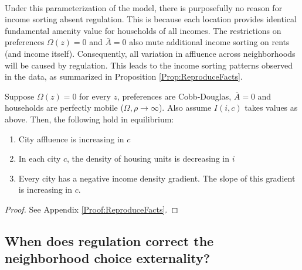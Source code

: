 \documentclass[12pt]{article}
\begin{document}
	\paragraph*{}
	Under this parameterization of the model, there is purposefully no reason for income sorting absent regulation. This is because each location provides identical fundamental amenity value for households of all incomes. The restrictions on preferences $\Omega(z) = 0$ and $\bar{A} = 0$ also mute additional income sorting on rents (and income itself).  Consequently, all variation in affluence across neighborhoods will be caused by regulation. This leads to the income sorting patterns observed in the data, as summarized in Proposition \ref{Prop:ReproduceFacts}.
	\begin{Proposition}\label{Prop:ReproduceFacts}
	Suppose $\Omega(z) = 0$ for every $z$, preferences are Cobb-Douglas, $\bar{A} = 0$ and households are perfectly mobile ($\Omega, \rho \to \infty$). Also assume $I(i, c)$ takes values as above. Then, the following hold in equilibrium:
	
		\begin{enumerate}
			\item City affluence is increasing in $c$
		
			\item In each city $c$, the density of housing units is decreasing in $i$ 
		
			\item Every city has a negative income density gradient. The slope of this gradient is increasing in $c$.
		\end{enumerate}
	
	\end{Proposition}
	\begin{proof}
		See Appendix \ref{Proof:ReproduceFacts}.
	\end{proof}
	
	
\subsection{When does regulation correct the neighborhood choice externality?}\label{Theory:Externality}
\end{document}
